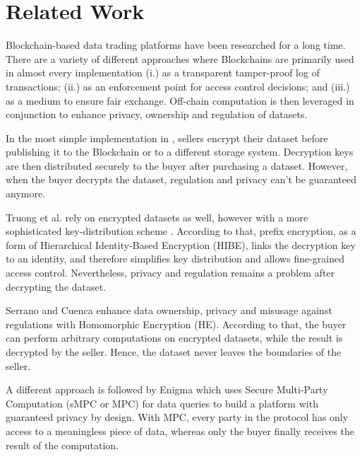 \chapter{Related Work}
\label{cha:relatedwork}

Blockchain-based data trading platforms have been researched for a long time. There are a variety of different approaches where Blockchains are primarily used in almost every implementation (i.) as a transparent tamper-proof log of transactions; (ii.) as an enforcement point for access control decisions; and (iii.) as a medium to ensure fair exchange. Off-chain computation is then leveraged in conjunction to enhance privacy, ownership and regulation of datasets.

In the most simple implementation in \cite{ozyilmazIDMoBIoTData2018,ramachandranDecentralizedDataMarketplace2018,banerjeeBlockchainEnabledData2019}, sellers encrypt their dataset before publishing it to the Blockchain or to a different storage system. Decryption keys are then distributed securely to the buyer after purchasing a dataset. However, when the buyer decrypts the dataset, regulation and privacy can't be guaranteed anymore.

Truong et al. rely on encrypted datasets as well, however with a more sophisticated key-distribution scheme \cite{truongSecureDecentralizedSharing2019}. According to that, prefix encryption, as a form of Hierarchical Identity-Based Encryption (HIBE), links the decryption key to an identity, and therefore simplifies key distribution and allows fine-grained access control. Nevertheless, privacy and regulation remains a problem after decrypting the dataset.

Serrano and Cuenca \cite{serranoPeertoPeerOwnershipPreservingData2021} enhance data ownership, privacy and misusage against regulations with Homomorphic Encryption (HE). According to that, the buyer can perform arbitrary computations on encrypted datasets, while the result is decrypted by the seller. Hence, the dataset never leaves the boundaries of the seller. %

A different approach is followed by Enigma \cite{shrobeEnigmaDecentralizedComputation2018} which uses Secure Multi-Party Computation (sMPC or MPC) for data queries to build a platform with guaranteed privacy by design. With MPC, every party in the protocol has only access to a meaningless piece of data, whereas only the buyer finally receives the result of the computation.

